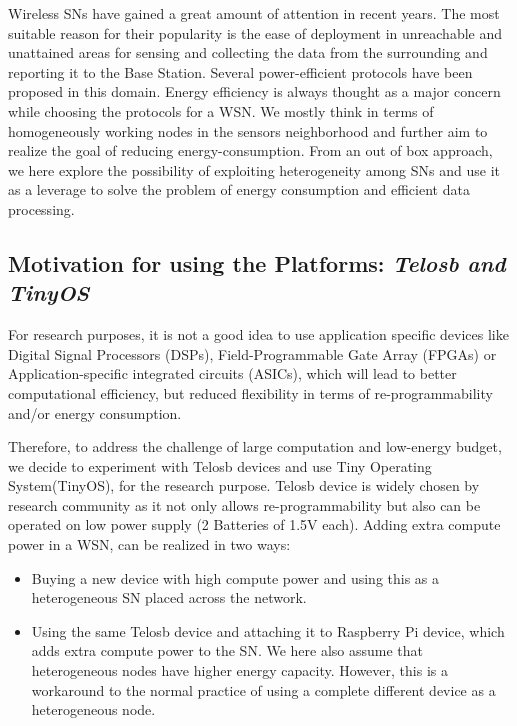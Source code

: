     Wireless \acp{SN} have gained a great amount of attention in recent years. The most suitable reason for their popularity is the ease of deployment in unreachable and unattained areas for sensing and collecting the data from the surrounding and reporting it to the Base Station. Several power-efficient protocols have been proposed in this domain. Energy efficiency is always thought as a major concern while choosing the protocols for a \ac{WSN}. We mostly think in terms of homogeneously working nodes in the sensors neighborhood and further aim to realize the goal of reducing energy-consumption. From an out of box approach, we here explore the possibility of exploiting heterogeneity among \acp{SN} and use it as a leverage to solve the problem of energy consumption and efficient data processing.
    
    \subsection*{Motivation for using the Platforms: \textit{Telosb and TinyOS}}
    
    For research purposes, it is not a good idea to use application specific devices like Digital Signal Processors (DSPs), Field-Programmable Gate Array (FPGAs) or Application-specific integrated circuits (ASICs), which will lead to better computational efficiency, but reduced flexibility in terms of re-programmability and/or energy consumption. 
    \par
    Therefore, to address the challenge of large computation and low-energy budget, we decide to experiment with Telosb devices and use Tiny Operating System(TinyOS), for the research purpose.
    Telosb device is widely chosen by research community as it not only allows re-programmability but also can be operated on low power supply (2 Batteries of 1.5V each). Adding extra compute power in a \acf{WSN}, can be realized in two ways:
    
    \begin{itemize}
    	\item Buying a new device with high compute power and using this as a heterogeneous \ac{SN} placed across the network.
    	
    	\item Using the same Telosb device and attaching it to Raspberry Pi device, which adds extra compute power to the \ac{SN}. We here also assume that heterogeneous nodes have higher energy capacity. However, this is a workaround to the normal practice of using a complete different device as a heterogeneous node.
    	
    \end{itemize}
    
